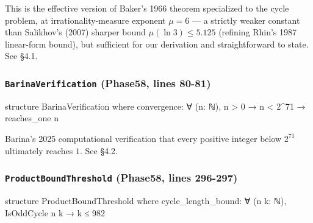 \documentclass[
  11pt]{amsart}
\newenvironment{Shaded}{}{}
\newcommand{\NormalTok}[1]{#1}
\theoremstyle{plain}
\theoremstyle{definition}
\theoremstyle{remark}
\begin{document}
This is the effective version of Baker's 1966 theorem specialized to the
cycle problem, at irrationality-measure exponent \(\mu = 6\) --- a
strictly weaker constant than Salikhov's (2007) sharper bound
\(\mu(\ln 3) \leq 5.125\) (refining Rhin's 1987 linear-form bound), but
sufficient for our derivation and straightforward to state. See §4.1.

\subsubsection*{\texorpdfstring{\texttt{BarinaVerification} (Phase58,
lines
80-81)}{BarinaVerification (Phase58, lines 80-81)}}\label{barinaverification-phase58-lines-80-81}

\begin{Shaded}
\begin{Highlighting}[]
\NormalTok{structure BarinaVerification where}
\NormalTok{  convergence: ∀ (n: ℕ), n \textgreater{} 0 → n \textless{} 2\^{}71 → reaches\_one n}
\end{Highlighting}
\end{Shaded}

Barina's 2025 computational verification that every positive integer
below \(2^{71}\) ultimately reaches \(1\). See §4.2.

\subsubsection*{\texorpdfstring{\texttt{ProductBoundThreshold} (Phase58,
lines
296-297)}{ProductBoundThreshold (Phase58, lines 296-297)}}\label{productboundthreshold-phase58-lines-296-297}

\begin{Shaded}
\begin{Highlighting}[]
\NormalTok{structure ProductBoundThreshold where}
\NormalTok{  cycle\_length\_bound: ∀ (n k: ℕ), IsOddCycle n k → k ≤ 982}
\end{Highlighting}
\end{Shaded}
\end{document}
